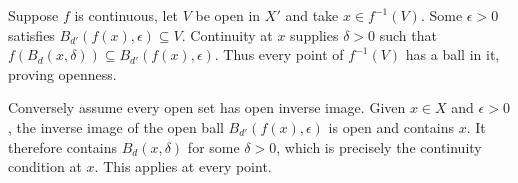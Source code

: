 Suppose $f$ is continuous, let $V$ be open in $X'$ and take $x\in f^{-1}(V)$. Some $\epsilon>0$ satisfies $B_{d'}(f(x),\epsilon)\subseteq V$. Continuity at $x$ supplies $\delta>0$ such that $f(B_d(x,\delta))\subseteq B_{d'}(f(x),\epsilon)$. Thus every point of $f^{-1}(V)$ has a ball in it, proving openness.

Conversely assume every open set has open inverse image. Given $x\in X$ and $\epsilon>0$, the inverse image of the open ball $B_{d'}(f(x),\epsilon)$ is open and contains $x$. It therefore contains $B_d(x,\delta)$ for some $\delta>0$, which is precisely the continuity condition at $x$. This applies at every point.
